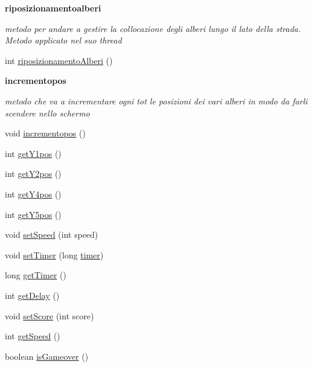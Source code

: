 \begin{Indent}\textbf{ riposizionamentoalberi}\par
{\em metodo per andare a gestire la collocazione degli alberi lungo il lato della strada. Metodo applicato nel suo thread }\begin{DoxyCompactItemize}
\item 
int \hyperlink{classcargame_1_1condivisa_ad8fe09dd7b1a7984263e49555b38e19d}{riposizionamento\+Alberi} ()
\end{DoxyCompactItemize}
\end{Indent}
\begin{Indent}\textbf{ incrementopos}\par
{\em metodo che va a incrementare ogni tot le posizioni dei vari alberi in modo da farli scendere nello schermo }\begin{DoxyCompactItemize}
\item 
void \hyperlink{classcargame_1_1condivisa_a67792a3a709b780ba197a7a90146235f}{incrementopos} ()
\item 
int \hyperlink{classcargame_1_1condivisa_a49e433a78f65839d0938617b9572e453}{get\+Y1pos} ()
\item 
int \hyperlink{classcargame_1_1condivisa_a70ced89b8879d050051033efae073c12}{get\+Y2pos} ()
\item 
int \hyperlink{classcargame_1_1condivisa_a8cf00057de784a7a6340baa7d77378db}{get\+Y4pos} ()
\item 
int \hyperlink{classcargame_1_1condivisa_aeb24cee3959c82e3fa622c2ceaf59cc9}{get\+Y5pos} ()
\item 
void \hyperlink{classcargame_1_1condivisa_a3b320d14ab676975894c44bd3ed68fbe}{set\+Speed} (int speed)
\item 
void \hyperlink{classcargame_1_1condivisa_ac28059108d8bb51d1f8e47bd4591c24b}{set\+Timer} (long \hyperlink{classcargame_1_1condivisa_a464494475fd50fe632c9e8bb3ffc63b3}{timer})
\item 
long \hyperlink{classcargame_1_1condivisa_a822b401425b70109c2537a534267e408}{get\+Timer} ()
\item 
int \hyperlink{classcargame_1_1condivisa_ab3d3f2281e778ff0b69ac11dddd092b4}{get\+Delay} ()
\item 
void \hyperlink{classcargame_1_1condivisa_aa6293371e2d8c3a2c7f9f512d738d53b}{set\+Score} (int score)
\item 
int \hyperlink{classcargame_1_1condivisa_ae2096b3878b5e714bf1d7b9d32389a5c}{get\+Speed} ()
\item 
boolean \hyperlink{classcargame_1_1condivisa_ae61fc75224a904d7267bf6637a5afce2}{is\+Gameover} ()

\end{DoxyCompactItemize}
\end{Indent}
